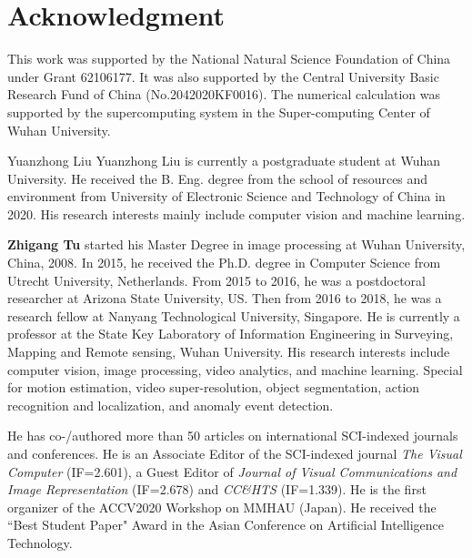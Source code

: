 \documentclass[journal]{IEEEtran}
\begin{document}
\section*{Acknowledgment}
This work was supported by the National Natural Science Foundation of China under Grant 62106177. It was also supported by the Central University Basic Research Fund of China (No.2042020KF0016). The numerical calculation was supported by the supercomputing system in the Super-computing Center of Wuhan University.

\ifCLASSOPTIONcaptionsoff
  \newpage
\fi




\begin{IEEEbiography}{Yuanzhong Liu}
Yuanzhong Liu is currently a postgraduate student at Wuhan University. He received the B. Eng. degree from the school of resources and environment from University of Electronic Science and Technology of China in 2020. His research interests mainly include computer vision and machine learning.
\end{IEEEbiography}

\vspace{-1.0cm}

\begin{IEEEbiography}
{\textbf{Zhigang Tu}} started his Master Degree in image processing at Wuhan University, China, 2008. In 2015, he received the Ph.D. degree in Computer Science from Utrecht University, Netherlands. From 2015 to 2016, he was a postdoctoral researcher at Arizona State University, US. Then from 2016 to 2018, he was a research fellow at Nanyang Technological University, Singapore. He is currently a professor at the State Key Laboratory of Information Engineering in Surveying, Mapping and Remote sensing, Wuhan University. His research interests include computer vision, image processing, video analytics, and machine learning. Special for motion estimation, video super-resolution, object segmentation, action recognition and localization, and anomaly event detection. 

He has co-/authored more than 50 articles on international SCI-indexed journals and conferences. He is an Associate Editor of the SCI-indexed journal \textit{The Visual Computer} (IF=2.601), a Guest Editor of \textit{Journal of Visual Communications and Image Representation} (IF=2.678) and \textit{CC\&HTS} (IF=1.339). He is the first organizer of the ACCV2020 Workshop on MMHAU (Japan). He received the ``Best Student Paper" Award in the  Asian Conference on Artificial Intelligence Technology.
\end{IEEEbiography}
\end{document}
